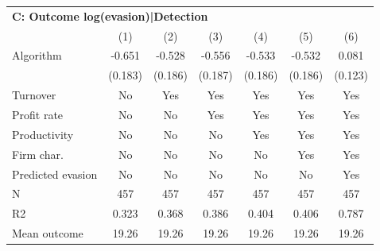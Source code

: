 \begin{tabular}{lcccccc}
\midrule \multicolumn{7}{l}{\textbf{C: Outcome log(evasion)|Detection}} \\ \multicolumn{1}{l}{} & (1) & (2) & (3) & (4) & (5) & (6) \\ \midrule
Algorithm   &      -0.651\sym{***}&      -0.528\sym{***}&      -0.556\sym{***}&      -0.533\sym{***}&      -0.532\sym{***}&       0.081         \\
            &     (0.183)         &     (0.186)         &     (0.187)         &     (0.186)         &     (0.186)         &     (0.123)         \\
\midrule
Turnover    &          No         &         Yes         &         Yes         &         Yes         &         Yes         &         Yes         \\
Profit rate &          No         &          No         &         Yes         &         Yes         &         Yes         &         Yes         \\
Productivity&          No         &          No         &          No         &         Yes         &         Yes         &         Yes         \\
Firm char.  &          No         &          No         &          No         &          No         &         Yes         &         Yes         \\
Predicted evasion&          No         &          No         &          No         &          No         &          No         &         Yes         \\
N           &         457         &         457         &         457         &         457         &         457         &         457         \\
R2          &       0.323         &       0.368         &       0.386         &       0.404         &       0.406         &       0.787         \\
Mean outcome&       19.26         &       19.26         &       19.26         &       19.26         &       19.26         &       19.26         \\
\bottomrule \end{tabular}
